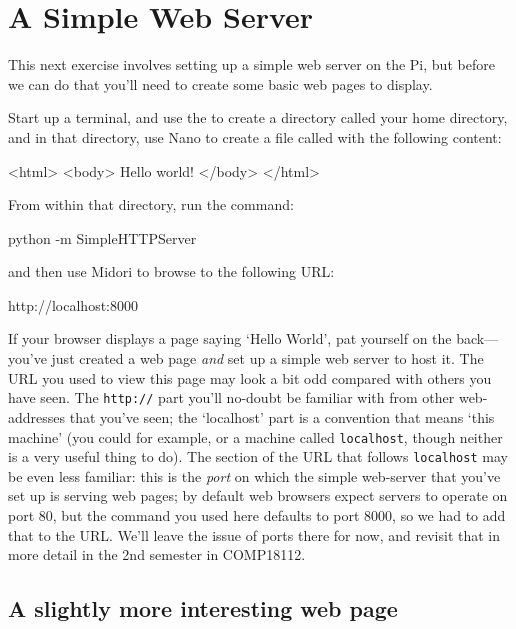 \section{A Simple Web Server}

This next exercise involves setting up a simple web server on the Pi, but before we can do that you'll need to create some basic web pages to display. 

Start up a terminal, and use the  to create a directory called  your home directory, and in that directory, use Nano to create a file called  with the following content:

\begin{ttoutenv}
<html>
<body>
Hello world!
</body>
</html>
\end{ttoutenv}

From within that directory, run the command:

\begin{ttoutenv}
python -m SimpleHTTPServer
\end{ttoutenv}

and then use Midori to browse to the following URL:

\begin{ttoutenv}
http://localhost:8000
\end{ttoutenv}

If your browser displays a page saying `Hello World', pat yourself on the back---you've just created a web page \textit{and} set up a simple web server to host it. The URL you used to view this page may look a bit odd compared with others you have seen. The \texttt{http://} part you'll no-doubt be familiar with from other web-addresses that you've seen; the `localhost' part is a convention that means `this machine' (you could for example,  or  a machine called \texttt{localhost}, though neither is a very useful thing to do). The section of the URL that follows \texttt{localhost} may be even less familiar: this is the \textit{port} on which the simple web-server that you've set up is serving web pages; by default web browsers expect servers to operate on port 80, but the  command you used here defaults to port 8000, so we had to add that to the URL. We'll leave the issue of ports there for now, and revisit that in more detail in the 2nd semester in COMP18112. 

\subsection{A slightly more interesting web page}


